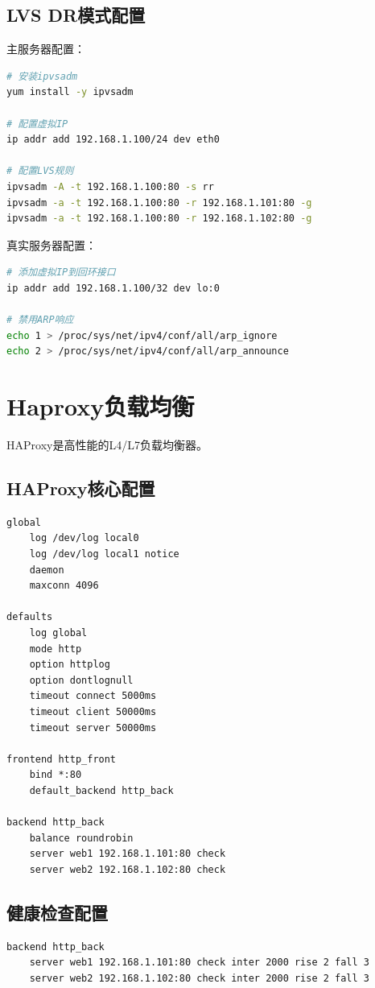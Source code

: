 \documentclass[12pt,UTF8]{ctexbook}
\begin{document}
\subsection*{LVS DR模式配置}

主服务器配置：
\begin{lstlisting}[language=bash]
# 安装ipvsadm
yum install -y ipvsadm

# 配置虚拟IP
ip addr add 192.168.1.100/24 dev eth0

# 配置LVS规则
ipvsadm -A -t 192.168.1.100:80 -s rr
ipvsadm -a -t 192.168.1.100:80 -r 192.168.1.101:80 -g
ipvsadm -a -t 192.168.1.100:80 -r 192.168.1.102:80 -g
\end{lstlisting}

真实服务器配置：
\begin{lstlisting}[language=bash]
# 添加虚拟IP到回环接口
ip addr add 192.168.1.100/32 dev lo:0

# 禁用ARP响应
echo 1 > /proc/sys/net/ipv4/conf/all/arp_ignore
echo 2 > /proc/sys/net/ipv4/conf/all/arp_announce
\end{lstlisting}

\section{Haproxy负载均衡}
\label{sec:haproxy}

HAProxy是高性能的L4/L7负载均衡器。

\subsection*{HAProxy核心配置}
\begin{lstlisting}
global
    log /dev/log local0
    log /dev/log local1 notice
    daemon
    maxconn 4096

defaults
    log global
    mode http
    option httplog
    option dontlognull
    timeout connect 5000ms
    timeout client 50000ms
    timeout server 50000ms

frontend http_front
    bind *:80
    default_backend http_back

backend http_back
    balance roundrobin
    server web1 192.168.1.101:80 check
    server web2 192.168.1.102:80 check
\end{lstlisting}

\subsection*{健康检查配置}
\begin{lstlisting}
backend http_back
    server web1 192.168.1.101:80 check inter 2000 rise 2 fall 3
    server web2 192.168.1.102:80 check inter 2000 rise 2 fall 3
\end{lstlisting}
\end{document}
